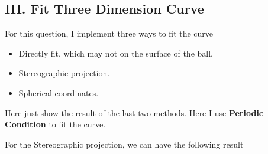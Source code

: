 \documentclass[a4paper]{article}
\begin{document}
\subsection{III. Fit Three Dimension Curve}

For this question, I implement three ways to fit the curve
\begin{itemize}
    \item Directly fit, which may not on the surface of the ball. 
    \item Stereographic projection. 
    \item Spherical coordinates. 
\end{itemize}
Here just show the result of the last two methods. Here I use \textbf{Periodic Condition} to fit the curve.

For the Stereographic projection, we can have the following result
\end{document}
